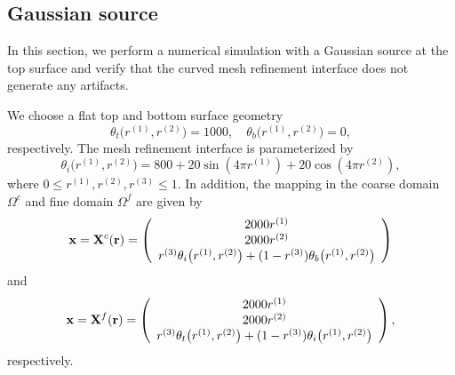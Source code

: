 \subsection{Gaussian source}\label{gaussian_source}
In this section, we perform a numerical simulation with a Gaussian source at the top surface and verify that the curved mesh refinement interface does not generate any artifacts. 

We choose a flat top and bottom surface geometry 
\begin{equation*}
\theta_t\big(r^{(1)},r^{(2)}\big) = 1000,\quad \theta_b\big(r^{(1)},r^{(2)}\big) = 0,
\end{equation*}
respectively. The mesh refinement interface is parameterized by
\begin{equation}\label{interface_gausian}
\theta_i\big(r^{(1)},r^{(2)}\big) = 800+20\sin(4\pi r^{(1)})+20\cos(4\pi r^{(2)}),
\end{equation}
where $0\leq r^{(1)}, r^{(2)}, r^{(3)}\leq 1$. 
In addition, the mapping in the coarse domain $\Omega^c$ and fine domain $\Omega^f$ are given by 
\[ {\bf x} = {\bf X}^c({\bf r}) = \left(\begin{array}{c}
2000 r^{(1)}\\
2000 r^{(2)}\\
r^{(3)} \theta_i\big(r^{(1)}, r^{(2)}\big) + (1-r^{(3)}) \theta_b\big(r^{(1)},r^{(2)}\big) \end{array}\right) \]
and 
\[ {\bf x} = {\bf X}^f({\bf r}) = \left(\begin{array}{c}
2000 r^{(1)}\\
2000 r^{(2)}\\
r^{(3)}\theta_t\big(r^{(1)},r^{(2)}\big) + (1-r^{(3)})\theta_i\big(r^{(1)},r^{(2)}\big)\end{array}\right), \]
respectively. 
